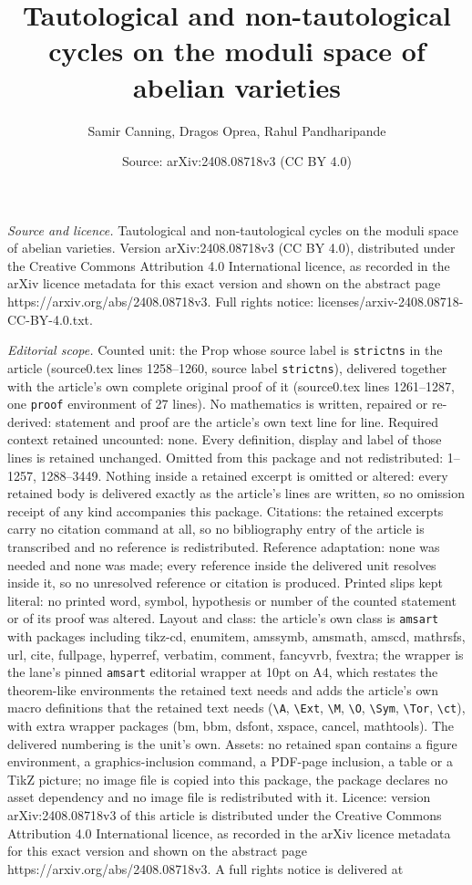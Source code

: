 \documentclass[10pt,a4paper]{amsart}
\title[Tautological and non-tautological cycles on the moduli space]{Tautological and non-tautological cycles on the moduli space of abelian varieties}
\author{Samir Canning, Dragos Oprea, Rahul Pandharipande}
\date{Source: arXiv:2408.08718v3 (CC BY 4.0)}
\begin{document}
\maketitle

\noindent\emph{Source and licence.} Tautological and non-tautological cycles on the moduli space of abelian varieties. Version arXiv:2408.08718v3 (CC BY 4.0), distributed under the Creative Commons Attribution 4.0 International licence, as recorded in the arXiv licence metadata for this exact version and shown on the abstract page https://arxiv.org/abs/2408.08718v3. Full rights notice: licenses/arxiv-2408.08718-CC-BY-4.0.txt.\par\smallskip

\noindent\textit{Editorial scope.} Counted unit: the Prop whose source label is \texttt{strictns} in the article (source0.tex lines 1258--1260, source label \texttt{strictns}), delivered together with the article's own complete original proof of it (source0.tex lines 1261--1287, one \texttt{proof} environment of 27 lines). No mathematics is written, repaired or re-derived: statement and proof are the article's own text line for line. Required context retained uncounted: none. Every definition, display and label of those lines is retained unchanged. Omitted from this package and not redistributed: 1--1257, 1288--3449. Nothing inside a retained excerpt is omitted or altered: every retained body is delivered exactly as the article's lines are written, so no omission receipt of any kind accompanies this package. Citations: the retained excerpts carry no citation command at all, so no bibliography entry of the article is transcribed and no reference is redistributed. Reference adaptation: none was needed and none was made; every reference inside the delivered unit resolves inside it, so no unresolved reference or citation is produced. Printed slips kept literal: no printed word, symbol, hypothesis or number of the counted statement or of its proof was altered. Layout and class: the article's own class is \texttt{amsart} with packages including tikz-cd, enumitem, amssymb, amsmath, amscd, mathrsfs, url, cite, fullpage, hyperref, verbatim, comment, fancyvrb, fvextra; the wrapper is the lane's pinned \texttt{amsart} editorial wrapper at 10pt on A4, which restates the theorem-like environments the retained text needs and adds the article's own macro definitions that the retained text needs (\texttt{\textbackslash A}, \texttt{\textbackslash Ext}, \texttt{\textbackslash M}, \texttt{\textbackslash O}, \texttt{\textbackslash Sym}, \texttt{\textbackslash Tor}, \texttt{\textbackslash ct}), with extra wrapper packages (bm, bbm, dsfont, xspace, cancel, mathtools). The delivered numbering is the unit's own. Assets: no retained span contains a figure environment, a graphics-inclusion command, a PDF-page inclusion, a table or a TikZ picture; no image file is copied into this package, the package declares no asset dependency and no image file is redistributed with it. Licence: version arXiv:2408.08718v3 of this article is distributed under the Creative Commons Attribution 4.0 International licence, as recorded in the arXiv licence metadata for this exact version and shown on the abstract page https://arxiv.org/abs/2408.08718v3. A full rights notice is delivered at 
\end{document}
